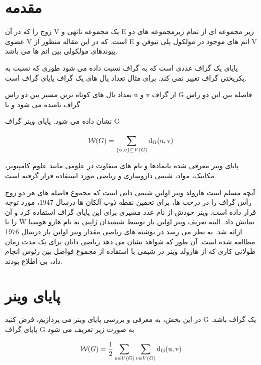 \documentclass[Persian]{cacna2023-fa}
\begin{document}
	\section{مقدمه}
	زوج  را که در آن V یک مجموعه ناتهی و E زیر مجموعه ای از تمام زیرمجموعه های دو عضوی 
	V است. که در این مقاله منظور از E اتم های موجود در مولکول پلی تیوفن و V  پیوندهای مولکولی بین اتم ها می باشد.

	پایای یک گراف عددی است که به گراف نسبت داده می شود طوری که نسبت به یکریختی
	گراف تغییر نمی کند. برای مثال تعداد یال های یک گراف پایای گراف است.

	تعداد یال های کوتاه ترین مسیر بین دو راس u و v از گراف G فاصله بین این دو راس گراف نامیده می شود و با 
	
	 نشان داده می شود.  
پایای وینر گراف G


\begin{equation}
	\mathcal{W}(G) =\sum_{\{ u,v\}  \subseteq V(G)}^{}\rm d_G(u, v)
\end{equation}

پایای وینر معرفی شده بانمادها و نام های متفاوت در علومی مانند علوم کامپیوتر،
مکانیک، مواد، شیمی داروسازی و ریاضی مورد استفاده قرار گرفته است.

آنچه مسلم است هارولد وینر اولین شیمی دانی است که مجموع فاصله های هر دو زوج 
رأس گراف را در درخت ها، برای تخمین نقطه ذوب آلکان ها درسال 1947، مورد توجه قرار داده است. وینر خودش از نام عدد مسیری برای این 
پایای گراف استفاده کرد و آن را با W 
نمایش داد. البته تعریف وینر اولین بار توسط شیمیدان ژاپنی به نام هارو هوسیا ارائه شد.
به نظر می رسد در نوشته های ریاضی مقدار وینر اولین بار درسال 1976 
مطالعه شده است. آن طور که شواهد نشان می دهد ریاضی دانان برای یک مدت زمان طولانی کاری که از
هارولد وینر در شیمی با استفاده از مجموع فواصل 
بین رئوس انجام داد، بی اطلاع بودند.\cite{1}



	 
	
	
	
	\section{پایای وینر}
	در این بخش، به معرفی و بررسی پایای وینر می پردازیم، فرض کنید
	G یک گراف باشد. پایای گراف G به صورت زیر تعریف می شود

	\begin{equation}
		\mathcal{W}(G) =\frac{1}{2} \sum_{u \in  V(G)} \sum_{v  \in V(G)}^{}\rm d_G(u, v)
	\end{equation}
\end{document}
